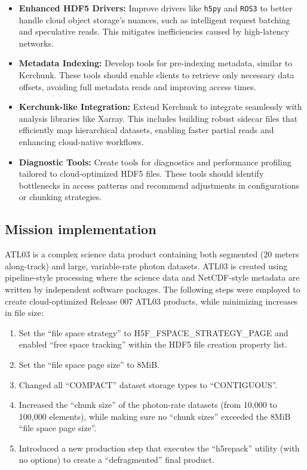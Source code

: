 \documentclass[
]{agujournal2019}
\providecommand{\tightlist}{%
  \setlength{\itemsep}{0pt}\setlength{\parskip}{0pt}}\usepackage{longtable,booktabs,array}
\begin{document}
\begin{itemize}
\tightlist
\item
  \textbf{Enhanced HDF5 Drivers:} Improve drivers like \texttt{h5py} and
  \texttt{ROS3} to better handle cloud object storage's nuances, such as
  intelligent request batching and speculative reads. This mitigates
  inefficiencies caused by high-latency networks.
\item
  \textbf{Metadata Indexing:} Develop tools for pre-indexing metadata,
  similar to Kerchunk. These tools should enable clients to retrieve
  only necessary data offsets, avoiding full metadata reads and
  improving access times.
\item
  \textbf{Kerchunk-like Integration:} Extend Kerchunk to integrate
  seamlessly with analysis libraries like Xarray. This includes building
  robust sidecar files that efficiently map hierarchical datasets,
  enabling faster partial reads and enhancing cloud-native workflows.
\item
  \textbf{Diagnostic Tools:} Create tools for diagnostics and
  performance profiling tailored to cloud-optimized HDF5 files. These
  tools should identify bottlenecks in access patterns and recommend
  adjustments in configurations or chunking strategies.
\end{itemize}

\subsection{Mission implementation}\label{mission-implementation}

ATL03 is a complex science data product containing both segmented (20
meters along-track) and large, variable-rate photon datasets. ATL03 is
created using pipeline-style processing where the science data and
NetCDF-style metadata are written by independent software packages. The
following steps were employed to create cloud-optimized Release 007
ATL03 products, while minimizing increases in file size:

\begin{enumerate}
\def\labelenumi{\arabic{enumi}.}
\tightlist
\item
  Set the ``file space strategy'' to H5F\_FSPACE\_STRATEGY\_PAGE and
  enabled ``free space tracking'' within the HDF5 file creation property
  list.
\item
  Set the ``file space page size'' to 8MiB.
\item
  Changed all ``COMPACT'' dataset storage types to ``CONTIGUOUS''.
\item
  Increased the ``chunk size'' of the photon-rate datasets (from 10,000
  to 100,000 elements), while making sure no ``chunk sizes'' exceeded
  the 8MiB ``file space page size''.
\item
  Introduced a new production step that executes the ``h5repack''
  utility (with no options) to create a ``defragmented'' final product.
\end{enumerate}
\end{document}
